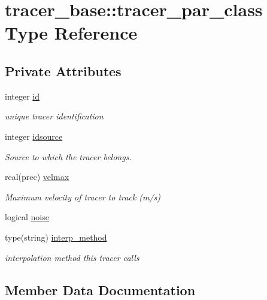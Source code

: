\hypertarget{structtracer__base_1_1tracer__par__class}{}\section{tracer\+\_\+base\+:\+:tracer\+\_\+par\+\_\+class Type Reference}
\label{structtracer__base_1_1tracer__par__class}
\subsection*{Private Attributes}
\begin{DoxyCompactItemize}
\item 
integer \hyperlink{structtracer__base_1_1tracer__par__class_ad7d0637c337b16787b0469e0bf5dfced}{id}
\begin{DoxyCompactList}\small\item\em unique tracer identification \end{DoxyCompactList}\item 
integer \hyperlink{structtracer__base_1_1tracer__par__class_a645bcb4eb7a0087394bd7eced244819d}{idsource}
\begin{DoxyCompactList}\small\item\em Source to which the tracer belongs. \end{DoxyCompactList}\item 
real(prec) \hyperlink{structtracer__base_1_1tracer__par__class_a7a6df785a9abc654a774b25fedb3c1e6}{velmax}
\begin{DoxyCompactList}\small\item\em Maximum velocity of tracer to track (m/s) \end{DoxyCompactList}\item 
logical \hyperlink{structtracer__base_1_1tracer__par__class_a6ed144d3b2b37e7e6d3fe9294cbb568d}{noise}
\item 
type(string) \hyperlink{structtracer__base_1_1tracer__par__class_a12aa1da016c290ce194cd779b1b00854}{interp\+\_\+method}
\begin{DoxyCompactList}\small\item\em interpolation method this tracer calls \end{DoxyCompactList}\end{DoxyCompactItemize}


\subsection{Member Data Documentation}
\mbox{\label{structtracer__base_1_1tracer__par__class_ad7d0637c337b16787b0469e0bf5dfced}} 
